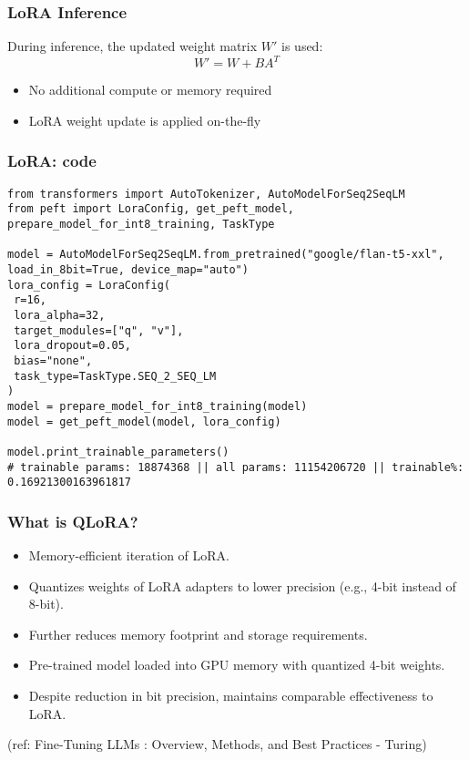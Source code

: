 \begin{frame}[fragile]\frametitle{LoRA Inference}
During inference, the updated weight matrix $W'$ is used:
$$W' = W + BA^T$$
\begin{itemize}
    \item No additional compute or memory required
    \item LoRA weight update is applied on-the-fly
\end{itemize}
\end{frame}


\begin{frame}[fragile]\frametitle{LoRA: code}
\begin{lstlisting}
from transformers import AutoTokenizer, AutoModelForSeq2SeqLM
from peft import LoraConfig, get_peft_model, prepare_model_for_int8_training, TaskType

model = AutoModelForSeq2SeqLM.from_pretrained("google/flan-t5-xxl", load_in_8bit=True, device_map="auto")
lora_config = LoraConfig(
 r=16,
 lora_alpha=32,
 target_modules=["q", "v"],
 lora_dropout=0.05,
 bias="none",
 task_type=TaskType.SEQ_2_SEQ_LM
)
model = prepare_model_for_int8_training(model)
model = get_peft_model(model, lora_config)

model.print_trainable_parameters()
# trainable params: 18874368 || all params: 11154206720 || trainable%: 0.16921300163961817
\end{lstlisting}
\end{frame}


\begin{frame}[fragile]\frametitle{What is QLoRA?}

  \begin{itemize}
    \item Memory-efficient iteration of LoRA.
    \item Quantizes weights of LoRA adapters to lower precision (e.g., 4-bit instead of 8-bit).
    \item Further reduces memory footprint and storage requirements.
    \item Pre-trained model loaded into GPU memory with quantized 4-bit weights.
    \item Despite reduction in bit precision, maintains comparable effectiveness to LoRA.
  \end{itemize}
  
  {\tiny (ref: Fine-Tuning LLMs : Overview, Methods, and Best Practices - Turing)}
  
\end{frame}

